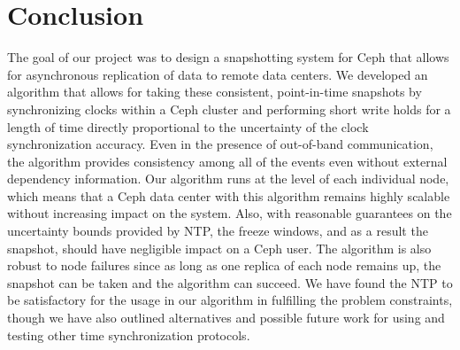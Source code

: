 \chapter{Conclusion}
\label{sec:conclusion}

The goal of our project was to design a snapshotting system for Ceph 
that allows for asynchronous replication of data to remote data centers.
We developed an algorithm that allows for taking these consistent, 
point-in-time snapshots by synchronizing clocks within a Ceph cluster
and performing short write holds for a length of time directly 
proportional to the uncertainty of the clock synchronization accuracy.
Even in the presence of out-of-band communication, the algorithm provides
consistency among all of the events even without external dependency
information. Our algorithm runs at the level of each individual node,
which means that a Ceph data center with this algorithm remains highly
scalable without increasing impact on the system. Also, with
reasonable guarantees on the uncertainty bounds provided by NTP, the
freeze windows, and as a result the snapshot, should have negligible
impact on a Ceph user. The algorithm is also robust to node failures
since as long as one replica of each node remains up, the snapshot can be
taken and the algorithm can succeed. We have found the NTP to be
satisfactory for the usage in our algorithm in fulfilling the problem
constraints, though we have also outlined alternatives and possible
future work for using and testing other time synchronization
protocols.
